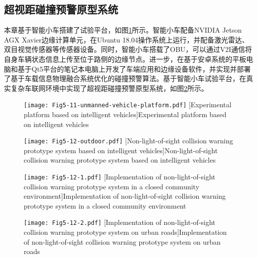 \subsection[\hspace{-2pt}超视距碰撞预警原型系统]{{ \hspace{-8pt}超视距碰撞预警原型系统}}

本章基于智能小车搭建了试验平台，如图\ref{fig 5-10}所示。智能小车配备NVIDIA Jetson AGX Xavier边缘计算单元，在Ubuntu 18.04操作系统上运行，并配备激光雷达、双目视觉传感器等传感器设备。同时，智能小车搭载了OBU，可以通过V2I通信将自身车辆状态信息上传至位于路侧的边缘节点。进一步，在基于安卓系统的平板电脑和基于Qt5平台的笔记本电脑上开发了车端应用和边缘设备软件，并实现并部署了基于车载信息物理融合系统优化的碰撞预警算法。基于智能小车试验平台，在真实复杂车联网环境中实现了超视距碰撞预警原型系统，如图\ref{fig 5-11}所示。

\begin{figure}[h]
\centering
  \texttt{[image: Fig5-11-unmanned-vehicle-platform.pdf]}
  [Experimental platform based on intelligent vehicles]{Experimental platform based on intelligent vehicles}
  \label{fig 5-10}
\end{figure}

\begin{figure}[h]
\centering
  \texttt{[image: Fig5-12-outdoor.pdf]}
  [Non-light-of-sight collision warning prototype system based on intelligent vehicles]{Non-light-of-sight collision warning prototype system based on intelligent vehicles}
  \label{fig 5-11}
\end{figure}

\begin{figure}[h] 
	\centering
	\texttt{[image: Fig5-12-1.pdf]}
	[Implementation of non-light-of-sight collision warning prototype system in a closed community environment]{Implementation of non-light-of-sight collision warning prototype system in a closed community environment}
	\label{fig 5-12-1}
\end{figure}

\begin{figure}[h] 
	\centering
	\texttt{[image: Fig5-12-2.pdf]}
	[Implementation of non-light-of-sight collision warning prototype system on urban roads]{Implementation of non-light-of-sight collision warning prototype system on urban roads}
	\label{fig 5-12-2}
\end{figure}

